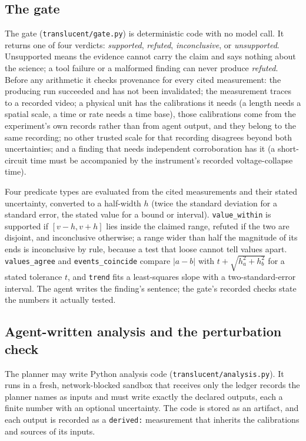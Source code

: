 \documentclass[11pt]{article}
\newcommand{\cmd}[1]{\texttt{#1}}
\begin{document}
\subsection{The gate}
The gate (\cmd{translucent/gate.py}) is deterministic code with no model call. It returns one of four verdicts:
\emph{supported}, \emph{refuted}, \emph{inconclusive}, or \emph{unsupported}. Unsupported means the evidence cannot
carry the claim and says nothing about the science; a tool failure or a malformed finding can never produce
\emph{refuted}. Before any arithmetic it checks provenance for every cited measurement: the producing run succeeded
and has not been invalidated; the measurement traces to a recorded video; a physical unit has the calibrations it
needs (a length needs a spatial scale, a time or rate needs a time base), those calibrations come from the
experiment's own records rather than from agent output, and they belong to the same recording; no other trusted scale
for that recording disagrees beyond both uncertainties; and a finding that needs independent corroboration has it
(a short-circuit time must be accompanied by the instrument's recorded voltage-collapse time).

Four predicate types are evaluated from the cited measurements and their stated uncertainty, converted to a
half-width $h$ (twice the standard deviation for a standard error, the stated value for a bound or interval).
\texttt{value\_within} is supported if $[v-h, v+h]$ lies inside the claimed range, refuted if the two are disjoint,
and inconclusive otherwise; a range wider than half the magnitude of its ends is inconclusive by rule, because a
test that loose cannot tell values apart. \texttt{values\_agree} and \texttt{events\_coincide} compare
$|a-b|$ with $t + \sqrt{h_a^2+h_b^2}$ for a stated tolerance $t$, and \texttt{trend} fits a least-squares slope with
a two-standard-error interval. The agent writes the finding's sentence; the gate's recorded checks state the numbers
it actually tested.

\subsection{Agent-written analysis and the perturbation check}
The planner may write Python analysis code (\cmd{translucent/analysis.py}). It runs in a fresh, network-blocked
sandbox that receives only the ledger records the planner names as inputs and must write exactly the declared outputs,
each a finite number with an optional uncertainty. The code is stored as an artifact, and each output is recorded as a
\texttt{derived:} measurement that inherits the calibrations and sources of its inputs.
\end{document}
